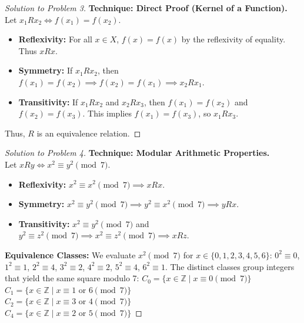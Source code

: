 \documentclass[11pt, a4paper]{article}
\theoremstyle{definition}
\theoremstyle{remark}
\newcommand{\Z}{\mathbb{Z}}
\begin{document}
\begin{proof}[Solution to Problem 3]
    \textbf{Technique: Direct Proof (Kernel of a Function).} \\
    Let $x_1 R x_2 \iff f(x_1) = f(x_2)$.
    \begin{itemize}
        \item \textbf{Reflexivity:} For all $x \in X$, $f(x) = f(x)$ by the reflexivity of equality. Thus $xRx$.
        \item \textbf{Symmetry:} If $x_1 R x_2$, then $f(x_1) = f(x_2) \implies f(x_2) = f(x_1) \implies x_2 R x_1$.
        \item \textbf{Transitivity:} If $x_1 R x_2$ and $x_2 R x_3$, then $f(x_1) = f(x_2)$ and $f(x_2) = f(x_3)$. This implies $f(x_1) = f(x_3)$, so $x_1 R x_3$.
    \end{itemize}
    Thus, $R$ is an equivalence relation.
\end{proof}

\begin{proof}[Solution to Problem 4]
    \textbf{Technique: Modular Arithmetic Properties.} \\
    Let $xRy \iff x^2 \equiv y^2 \pmod 7$.
    \begin{itemize}
        \item \textbf{Reflexivity:} $x^2 \equiv x^2 \pmod 7 \implies xRx$.
        \item \textbf{Symmetry:} $x^2 \equiv y^2 \pmod 7 \implies y^2 \equiv x^2 \pmod 7 \implies yRx$.
        \item \textbf{Transitivity:} $x^2 \equiv y^2 \pmod 7$ and $y^2 \equiv z^2 \pmod 7 \implies x^2 \equiv z^2 \pmod 7 \implies xRz$.
    \end{itemize}
    \textbf{Equivalence Classes:} We evaluate $x^2 \pmod 7$ for $x \in \{0, 1, 2, 3, 4, 5, 6\}$:
    $0^2 \equiv 0$, $1^2 \equiv 1$, $2^2 \equiv 4$, $3^2 \equiv 2$, $4^2 \equiv 2$, $5^2 \equiv 4$, $6^2 \equiv 1$.
    The distinct classes group integers that yield the same square modulo 7:
    $C_0 = \{x \in \Z \mid x \equiv 0 \pmod 7\}$ \\
    $C_1 = \{x \in \Z \mid x \equiv 1 \text{ or } 6 \pmod 7\}$ \\
    $C_2 = \{x \in \Z \mid x \equiv 3 \text{ or } 4 \pmod 7\}$ \\
    $C_4 = \{x \in \Z \mid x \equiv 2 \text{ or } 5 \pmod 7\}$
\end{proof}
\end{document}
